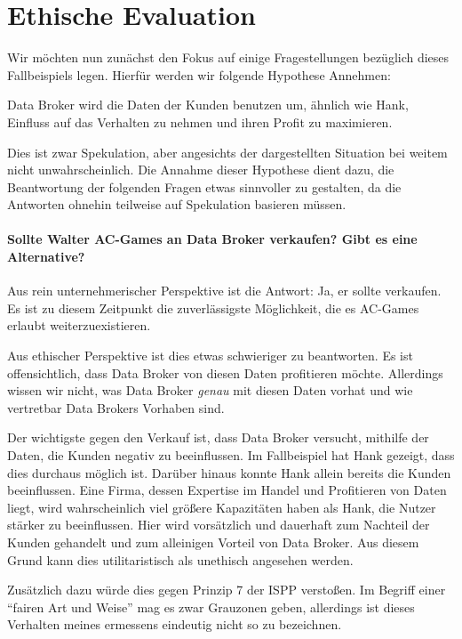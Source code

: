 \section{Ethische Evaluation}

Wir möchten nun zunächst den Fokus auf einige Fragestellungen bezüglich dieses Fallbeispiels legen. Hierfür werden wir folgende Hypothese Annehmen:

\begin{center}
\parbox{0.8\textwidth}{
    Data Broker wird die Daten der Kunden benutzen um, ähnlich wie Hank, Einfluss auf das Verhalten zu nehmen und ihren Profit zu maximieren. 
}
\end{center}

Dies ist zwar Spekulation, aber angesichts der dargestellten Situation bei weitem nicht unwahrscheinlich.
Die Annahme dieser Hypothese dient dazu, die Beantwortung der folgenden Fragen etwas sinnvoller zu gestalten, da die Antworten ohnehin teilweise auf Spekulation basieren müssen.

\paragraph*{Sollte Walter AC-Games an Data Broker verkaufen? \cite{kees_faites_2017} Gibt es eine Alternative?}

Aus rein unternehmerischer Perspektive ist die Antwort: Ja, er sollte verkaufen.
Es ist zu diesem Zeitpunkt die zuverlässigste Möglichkeit, die es AC-Games erlaubt weiterzuexistieren.

Aus ethischer Perspektive ist dies etwas schwieriger zu beantworten.
Es ist offensichtlich, dass Data Broker von diesen Daten profitieren möchte.
Allerdings wissen wir nicht, was Data Broker \emph{genau} mit diesen Daten vorhat und wie vertretbar Data Brokers Vorhaben sind.

Der wichtigste gegen den Verkauf ist, dass Data Broker versucht, mithilfe der Daten, die Kunden negativ zu beeinflussen. 
Im Fallbeispiel hat Hank gezeigt, dass dies durchaus möglich ist.
Darüber hinaus konnte Hank allein bereits die Kunden beeinflussen.
Eine Firma, dessen Expertise im Handel und Profitieren von Daten liegt, wird wahrscheinlich viel größere Kapazitäten haben als Hank, die Nutzer stärker zu beeinflussen.
Hier wird vorsätzlich und dauerhaft zum Nachteil der Kunden gehandelt und zum alleinigen Vorteil von Data Broker. Aus diesem Grund kann dies utilitaristisch als unethisch angesehen werden.

Zusätzlich dazu würde dies gegen Prinzip 7 der ISPP verstoßen. Im Begriff einer \enquote{fairen Art und Weise} mag es zwar Grauzonen geben, allerdings ist dieses Verhalten meines ermessens eindeutig nicht so zu bezeichnen.  


